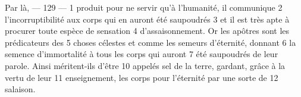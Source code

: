 Par là,	 
 	--- 129 ---	 
1	 	produit pour ne servir qu'à l'humanité, il communique	 
2	 	l'incorruptibilité aux corps qui en auront été saupoudrés	 
3	 	et il est très apte à procurer toute espèce de sensation	 
4	 	d'assaisonnement. Or les apôtres sont les prédicateurs des	 
5	 	choses célestes et comme les semeurs d'éternité, donnant	 
6	 	la semence d'immortalité à tous les corps qui auront	 
7	 	été saupoudrés de leur parole. Ainsi méritent-ils d'être	 
10	 	appelés sel de la terre, gardant, grâce à la vertu de leur	 
11	 	enseignement, les corps pour l'éternité par une sorte de	 
12	 	salaison.